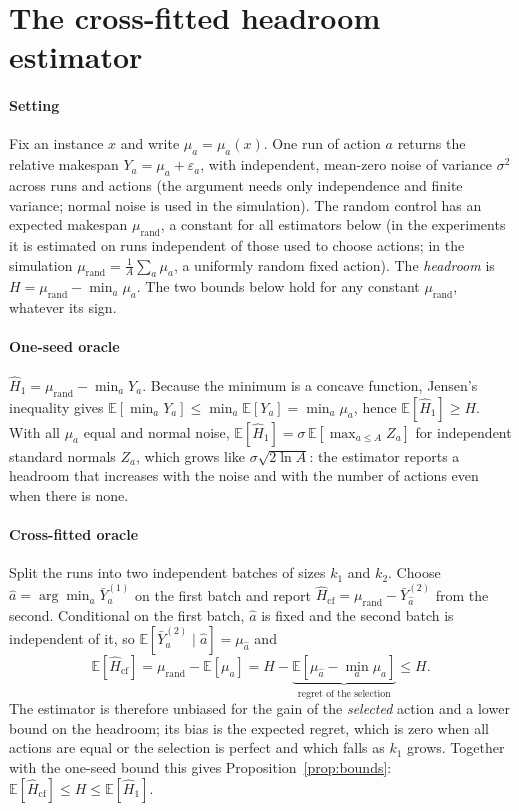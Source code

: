 \section{The cross-fitted headroom estimator}
\label{app:estimator}
\paragraph{Setting} Fix an instance $x$ and write $\mu_a=\mu_a(x)$. One run of action $a$ returns the relative makespan $Y_a=\mu_a+\varepsilon_a$, with independent, mean-zero noise of variance $\sigma^2$ across runs and actions (the argument needs only independence and finite variance; normal noise is used in the simulation). The random control has an expected makespan $\mu_{\mathrm{rand}}$, a constant for all estimators below (in the experiments it is estimated on runs independent of those used to choose actions; in the simulation $\mu_{\mathrm{rand}}=\frac1A\sum_a\mu_a$, a uniformly random fixed action). The \emph{headroom} is $H=\mu_{\mathrm{rand}}-\min_a\mu_a$. The two bounds below hold for any constant $\mu_{\mathrm{rand}}$, whatever its sign.

\paragraph{One-seed oracle} $\hat H_1=\mu_{\mathrm{rand}}-\min_aY_a$. Because the minimum is a concave function, Jensen's inequality gives $\mathbb E[\min_aY_a]\le\min_a\mathbb E[Y_a]=\min_a\mu_a$, hence $\mathbb E[\hat H_1]\ge H$. With all $\mu_a$ equal and normal noise, $\mathbb E[\hat H_1]=\sigma\,\mathbb E[\max_{a\le A}Z_a]$ for independent standard normals $Z_a$, which grows like $\sigma\sqrt{2\ln A}$: the estimator reports a headroom that increases with the noise and with the number of actions even when there is none.

\paragraph{Cross-fitted oracle} Split the runs into two independent batches of sizes $k_1$ and $k_2$. Choose $\hat a=\arg\min_a\bar Y_a^{(1)}$ on the first batch and report $\hat H_{\mathrm{cf}}=\mu_{\mathrm{rand}}-\bar Y_{\hat a}^{(2)}$ from the second. Conditional on the first batch, $\hat a$ is fixed and the second batch is independent of it, so $\mathbb E[\bar Y_{\hat a}^{(2)}\mid\hat a]=\mu_{\hat a}$ and
\[
\mathbb E[\hat H_{\mathrm{cf}}]=\mu_{\mathrm{rand}}-\mathbb E[\mu_{\hat a}]=H-\underbrace{\mathbb E[\mu_{\hat a}-\min_a\mu_a]}_{\text{regret of the selection}}\le H .
\]
The estimator is therefore unbiased for the gain of the \emph{selected} action and a lower bound on the headroom; its bias is the expected regret, which is zero when all actions are equal or the selection is perfect and which falls as $k_1$ grows. Together with the one-seed bound this gives Proposition~\ref{prop:bounds}: $\mathbb E[\hat H_{\mathrm{cf}}]\le H\le\mathbb E[\hat H_1]$.

